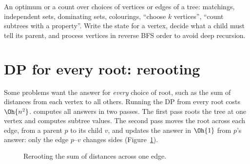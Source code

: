 
\begin{recognize}
An optimum or a count over choices of vertices or edges of a tree: matchings, independent sets, dominating sets, colourings, ``choose
$k$ vertices'', ``count subtrees with a property''. Write the state for a vertex, decide what a child must tell its parent, and
process vertices in reverse BFS order to avoid deep recursion.
\end{recognize}

\section[Rerooting]{DP for every root: rerooting \hfill \gold}\label{sec:rerooting}

Some problems want the answer for \emph{every} choice of root, such as the sum of distances from each vertex to all others. Running
the DP from every root costs $\Oh{n^2}$.  computes all answers in two passes. The first pass roots the tree at one
vertex and computes subtree values. The second pass moves the root across each edge, from a parent $p$ to its child $v$, and updates
the answer in $\Oh{1}$ from $p$'s answer: only the edge $p$--$v$ changes sides (Figure~\ref{fig:reroot}).

\begin{figure}[htbp]
\centering
{}
\caption{Rerooting the sum of distances across one edge.}
\label{fig:reroot}
\end{figure}

